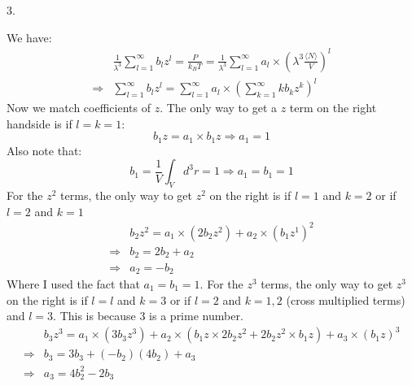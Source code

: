 \documentclass[a4paper,12pt]{article}
\begin{document}
3.
\begin{minipage}[t]{0.9\textwidth}
  We have:
  \begin{align*}
                & \frac{1}{\lambda^3} \sum_{l=1}^\infty b_l z^l = \frac{P}{k_BT} = \frac{1}{\lambda^3} \sum_{l =1}^\infty a_l \times \left(\lambda^3 \frac{\langle N\rangle}{V} \right)^l\\
    \Rightarrow & \sum_{l=1}^\infty b_l z^l =\sum_{l =1}^\infty a_l \times \left(\sum_{k=1}^\infty k b_k z^k\right)^l
  \end{align*}
  Now we match coefficients of $z$. The only way to get a $z$ term on the right handside is if $l = k = 1$:
  \begin{equation*}
    b_1z = a_1 \times b_1 z \Rightarrow a_1 = 1
  \end{equation*}
  Also note that:
  \begin{equation*}
    b_1 = \frac{1}{V}\int_Vd^3r = 1 \Rightarrow a_1=b_1 = 1
  \end{equation*}
  For the $z^2$ terms, the only way to get $z^2$ on the right is if $l = 1$ and $k = 2$ or if $l = 2$ and $k = 1$
  \begin{align*}
                & b_2z^2 = a_1 \times (2 b_2 z^2) + a_2 \times (b_1 z^1)^2\\
    \Rightarrow & b_2 = 2 b_2 + a_2 \\
    \Rightarrow & a_2 = - b_2
  \end{align*}
  Where I used the fact that $a_1 = b_1 = 1$.
  For the $z^3$ terms, the only way to get $z^3$ on the right is if $l = l$ and $k = 3$ or if $l = 2$ and $k = 1, 2$ (cross multiplied terms) and $l = 3$. This is because $3$ is a prime number.
  \begin{align*}
                & b_3z^3 = a_1 \times (3 b_3 z^3) + a_2 \times (b_1 z \times 2 b_2 z^2 + 2 b_2 z^2 \times b_1 z) + a_3 \times (b_1 z)^3\\
    \Rightarrow & b_3 = 3 b_3 + (-b_2)(4 b_2) + a_3\\
    \Rightarrow & a_3 = 4 b_2^2 - 2 b_3
  \end{align*}
\end{minipage}
\end{document}
